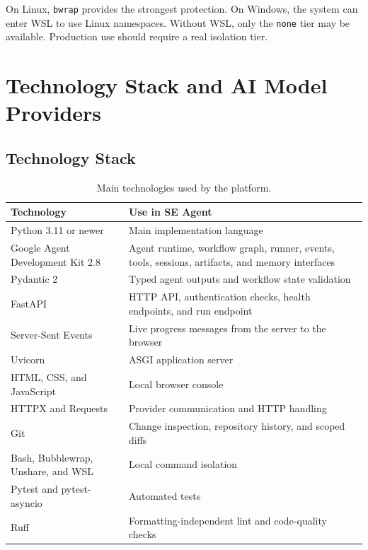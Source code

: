 \documentclass[11pt,a4paper]{article}
\begin{document}
On Linux, \texttt{bwrap} provides the strongest protection. On Windows, the
system can enter WSL to use Linux namespaces. Without WSL, only the
\texttt{none} tier may be available. Production use should require a real
isolation tier.

\section{Technology Stack and AI Model Providers}

\subsection{Technology Stack}

\begin{table}[H]
\centering
\small
\begin{tabularx}{\textwidth}{L{0.27\textwidth}Y}
\toprule
\textbf{Technology} & \textbf{Use in SE Agent} \\
\midrule
Python 3.11 or newer & Main implementation language \\
Google Agent Development Kit 2.8 & Agent runtime, workflow graph, runner, events, tools, sessions, artifacts, and memory interfaces \\
Pydantic 2 & Typed agent outputs and workflow state validation \\
FastAPI & HTTP API, authentication checks, health endpoints, and run endpoint \\
Server-Sent Events & Live progress messages from the server to the browser \\
Uvicorn & ASGI application server \\
HTML, CSS, and JavaScript & Local browser console \\
HTTPX and Requests & Provider communication and HTTP handling \\
Git & Change inspection, repository history, and scoped diffs \\
Bash, Bubblewrap, Unshare, and WSL & Local command isolation \\
Pytest and pytest-asyncio & Automated tests \\
Ruff & Formatting-independent lint and code-quality checks \\
\bottomrule
\end{tabularx}
\caption{Main technologies used by the platform.}
\label{tab:tech-stack}
\end{table}
\end{document}
